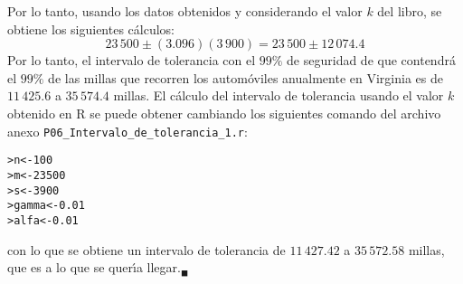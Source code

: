 \begin{solucion}
 Por lo tanto, usando los datos obtenidos y considerando el valor $k$ del libro, se obtiene los siguientes c\'alculos:
 \begin{equation*}
  23\,500 \pm (3.096)(3\,900) = 23\,500 \pm 12\,074.4
 \end{equation*}
 Por lo tanto, el intervalo de tolerancia con el $99\%$ de seguridad de que contendr\'a el $99\%$ de las millas que recorren los autom\'oviles anualmente en Virginia es de $11\,425.6$ a $35\,574.4$ millas. El c\'alculo del intervalo de tolerancia usando el valor $k$ obtenido en R se puede obtener cambiando los siguientes comando del archivo anexo \texttt{P06\_Intervalo\_de\_tolerancia\_1.r}:
 \begin{verbatim}
>n<-100
>m<-23500
>s<-3900
>gamma<-0.01
>alfa<-0.01
 \end{verbatim}
 con lo que se obtiene un intervalo de tolerancia de $11\,427.42$ a $35\,572.58$ millas, que es a lo que se quer\'{\i}a llegar.${}_{\blacksquare}$
\end{solucion}
